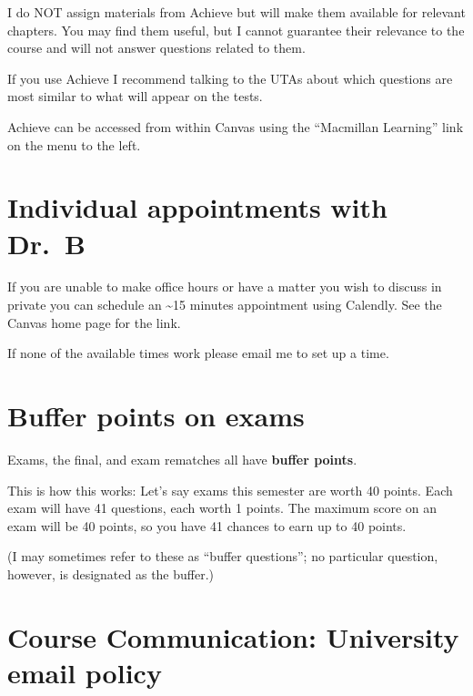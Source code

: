 \documentclass[
]{book}
\begin{document}
I do NOT assign materials from Achieve but will make them available for relevant chapters. You may find them useful, but I cannot guarantee their relevance to the course and will not answer questions related to them.

If you use Achieve I recommend talking to the UTAs about which questions are most similar to what will appear on the tests.

Achieve can be accessed from within Canvas using the ``Macmillan Learning'' link on the menu to the left.

\hypertarget{individual-appointments-with-dr.-b}{%
\chapter{Individual appointments with Dr.~B}\label{individual-appointments-with-dr.-b}}

If you are unable to make office hours or have a matter you wish to discuss in private you can schedule an \textasciitilde15 minutes appointment using Calendly. See the Canvas home page for the link.

If none of the available times work please email me to set up a time.

\hypertarget{buffer-points-on-exams}{%
\chapter{Buffer points on exams}\label{buffer-points-on-exams}}

Exams, the final, and exam rematches all have \textbf{buffer points}.

This is how this works: Let's say exams this semester are worth 40 points. Each exam will have 41 questions, each worth 1 points. The maximum score on an exam will be 40 points, so you have 41 chances to earn up to 40 points.

(I may sometimes refer to these as ``buffer questions''; no particular question, however, is designated as the buffer.)

\hypertarget{course-communication-university-email-policy}{%
\chapter{Course Communication: University email policy}\label{course-communication-university-email-policy}}
\end{document}
